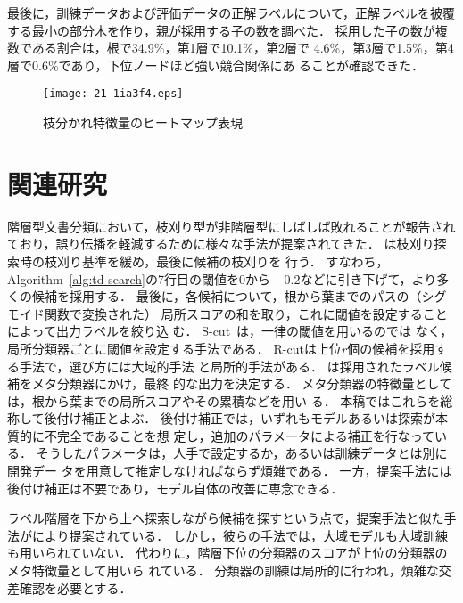 \documentclass[japanese]{jnlp_1.4}
\begin{document}
最後に，訓練データおよび評価データの正解ラベルについて，正解ラベルを被覆
する最小の部分木を作り，親が採用する子の数を調べた．
採用した子の数が複数である割合は，根で34.9\%，第1層で10.1\%，第2層で
4.6\%，第3層で1.5\%，第4層で0.6\%であり，下位ノードほど強い競合関係にあ
ることが確認できた．

\begin{figure}[t]
\begin{center}
\texttt{[image: 21-1ia3f4.eps]}
\end{center}
 \caption{枝分かれ特徴量のヒートマップ表現}
 \label{fig:br-heatmap}
\end{figure}


\section{関連研究}
\label{sec:related-work}

階層型文書分類において，枝刈り型が非階層型にしばしば敗れることが報告され
ており，誤り伝播を軽減するために様々な手法が提案されてきた．
\cite{Sasaki2012}は枝刈り探索時の枝刈り基準を緩め，最後に候補の枝刈りを
行う．
すなわち，Algorithm~\ref{alg:td-search}の7行目の閾値を$0$から
$-0.2$などに引き下げて，より多くの候補を採用する．
最後に，各候補について，根から葉までのパスの（シグモイド関数で変換された）
局所スコアの和を取り，これに閾値を設定することによって出力ラベルを絞り込
む．
S-cut~\cite{Montejo2006,Wang2011IJCNLPfull}は，一律の閾値を用いるのでは
なく，局所分類器ごとに閾値を設定する手法である．
R-cutは上位$r$個の候補を採用する手法で，選び方には大域的手法
\cite{Liu2005,Montejo2006}と局所的手法\cite{Wang2011IJCNLPfull}がある．
\cite{Wang2011IJCNLPfull}は採用されたラベル候補をメタ分類器にかけ，最終
的な出力を決定する．
メタ分類器の特徴量としては，根から葉までの局所スコアやその累積などを用い
る．
本稿ではこれらを総称して後付け補正とよぶ．
後付け補正では，いずれもモデルあるいは探索が本質的に不完全であることを想
定し，追加のパラメータによる補正を行なっている．
そうしたパラメータは，人手で設定するか，あるいは訓練データとは別に開発デー
タを用意して推定しなければならず煩雑である．
一方，提案手法には後付け補正は不要であり，モデル自体の改善に専念できる．

ラベル階層を下から上へ探索しながら候補を探すという点で，提案手法と似た手
法が\cite{Bennett2009}により提案されている．
しかし，彼らの手法では，大域モデルも大域訓練も用いられていない．
代わりに，階層下位の分類器のスコアが上位の分類器のメタ特徴量として用いら
れている．
分類器の訓練は局所的に行われ，煩雑な交差確認を必要とする．
\end{document}
